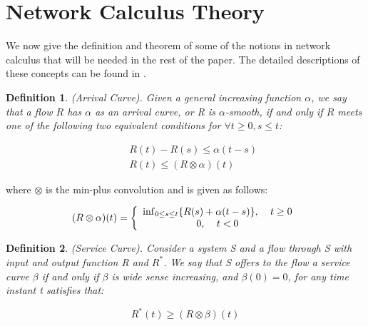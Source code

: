 \documentclass[a4paper]{article}
\newtheorem{definition}{Definition}
\begin{document}
\section{Network Calculus Theory}

We now give the definition and theorem of some of the notions in network calculus that will be needed in the rest of the paper. The detailed descriptions of these concepts can be found in \cite{le2001}.

\begin{definition}
(Arrival Curve). Given a general increasing function $\alpha$, we say that a flow $R$ has $\alpha$ as an arrival curve, or R is $\alpha$-smooth, if and only if $R$ meets one of the following two equivalent conditions for $\forall t \ge 0,s \le t$:

\begin{eqnarray}
  &&R(t) - R(s) \le \alpha (t - s)\\
  &&R(t) \le (R \otimes \alpha )(t)
\end{eqnarray}

\end{definition}

\noindent where $\otimes$ is the min-plus convolution and is given as follows:

\begin{equation}\label{}
  (R \otimes \alpha )(t) = \left\{ {\begin{array}{*{20}{c}}
  {{{\inf }_{0 \le s \le t}}\{ R(s) + \alpha (t - s)\} ,{\kern 1pt} {\kern 1pt} {\kern 1pt} {\kern 1pt} {\kern 1pt} {\kern 1pt} {\kern 1pt} {\kern 1pt} {\kern 1pt} {\kern 1pt} {\kern 1pt} t \ge 0}\\
  {0,{\kern 1pt} {\kern 1pt} {\kern 1pt} {\kern 1pt} {\kern 1pt} {\kern 1pt} {\kern 1pt} {\kern 1pt} {\kern 1pt} {\kern 1pt} {\kern 1pt} t < 0}
  \end{array}} \right.
\end{equation}

\begin{definition}
(Service Curve). Consider a system S and a flow through S with input and output function R and ${R^*}$. We say that S offers to the flow a service curve $\beta$ if and only if $\beta$ is wide sense increasing, and $\beta (0) = 0$, for any time instant t satisfies that:

\begin{equation}\label{}
  {R^*}(t) \ge (R \otimes \beta )(t)
\end{equation}

\end{definition}
\end{document}

